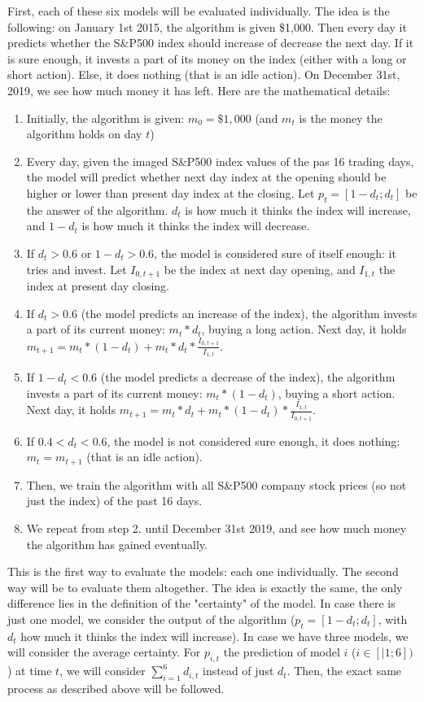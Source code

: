 \documentclass[11pt]{article}
\begin{document}
\begin{onehalfspace}
First, each of these six models will be evaluated individually. The idea is the following: on January 1st 2015, the algorithm is given \$1,000. Then every day it predicts whether the S\&P500 index should increase of decrease the next day. If it is sure enough, it invests a part of its money on the index (either with a long or short action). Else, it does nothing (that is an idle action). On December 31st, 2019, we see how much money it has left. Here are the mathematical details: 

\begin{enumerate}
    \item Initially, the algorithm is given: $m_0 = \$1,000$ (and $m_t$ is the money the algorithm holds on day $t$)
    \item Every day, given the imaged S\&P500 index values of the pas 16 trading days, the model will predict whether next day index at the opening should be higher or lower than present day index at the closing. Let $p_t = [1 - d_t;d_t]$ be the answer of the algorithm. $d_t$ is how much it thinks the index will increase, and $1-d_t$ is how much it thinks the index will decrease.
    \item If $d_t > 0.6$ or $1 - d_t > 0.6$, the model is considered sure of itself enough: it tries and invest. Let $I_{0,t+1}$ be the index at next day opening, and $I_{1,t}$ the index at present day closing.
    \item If $d_t > 0.6$ (the model predicts an increase of the index), the algorithm invests a part of its current money: $m_t * d_t$, buying a long action. Next day, it holds $m_{t+1} = m_t * (1-d_t) + m_t * d_t * \frac{I_{0,t+1}}{I_{1,t}}$.    
    \item If $1 - d_t < 0.6$ (the model predicts a decrease of the index), the algorithm invests a part of its current money: $m_t * (1- d_t)$, buying a short action. Next day, it holds $m_{t+1} = m_t * d_t + m_t * (1 - d_t) * \frac{I_{1,t}}{I_{0,t+1}}$.
    \item If $0.4 < d_t < 0.6$, the model is not considered sure enough, it does nothing: $m_t = m_{t+1}$ (that is an idle action).
    \item Then, we train the algorithm with all S\&P500 company stock prices (so not just the index) of the past 16 days. 
    \item We repeat from step 2. until December 31st 2019, and see how much money the algorithm has gained eventually.
\end{enumerate}

This is the first way to evaluate the models: each one individually. The second way will be to evaluate them altogether. The idea is exactly the same, the only difference lies in the definition of the "certainty" of the model. In case there is just one model, we consider the output of the algorithm ($p_t = [1 - d_t;d_t]$, with $d_t$ how much it thinks the index will increase). In case we have three models, we will consider the average certainty. For $p_{i,t}$ the prediction of model $i$ ($i \in [|1;6])$) at time $t$, we will consider $\sum\limits_{i=1}^{6} d_{i,t}$ instead of just $d_t$. Then, the exact same process as described above will be followed.


\end{onehalfspace}
\end{document}
